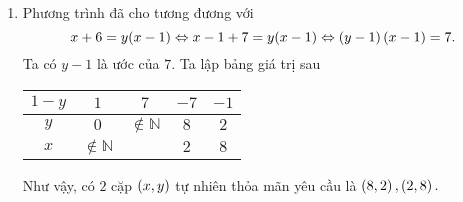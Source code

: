 \begin{bx}
{\begin{enumerate}[a,]
\begin{center}
\begin{tabular}{c|c|c|c|c}
            $1-y$ & $1$ & $5$ & $-5$ &$-1$  \\
            \hline
            $y$ & $0$ & $\notin\mathbb{N}$ & $6$ &$2$\\
            \hline
             $x$ & $3$ &  & $\notin \mathbb{N}$ &$\notin \mathbb{N}$
        \end{tabular}
    \end{center}
    Như vậy, có duy nhất một cặp số tự nhiên thỏa mãn yêu cầu là $\tron{x,y}=\tron{0,3}.$
    \item Phương trình đã cho tương đương với
    $$x+6=y(x-1)\Leftrightarrow x-1+7=y(x-1)\Leftrightarrow (y-1)\left(\displaystyle x-1 \right)=7.$$
    Ta có $y-1$ là ước của $7.$ Ta lập bảng giá trị sau
    \begin{center}
        \begin{tabular}{c|c|c|c|c}
            $1-y$ & $1$ & $7$ & $-7$ &$-1$  \\
            \hline
            $y$ & $0$ & $\notin\mathbb{N}$ & $8$ &$2$\\
            \hline
             $x$ & $\notin \mathbb{N}$ &  & $2$ &$8$
        \end{tabular}
    \end{center}
     Như vậy,  có $2$ cặp $\left(\displaystyle x,y \right)$ tự nhiên thỏa mãn yêu cầu là $\left(\displaystyle 8,2 \right), \left(\displaystyle 2,8 \right).$
\end{enumerate}}

\end{bx}

